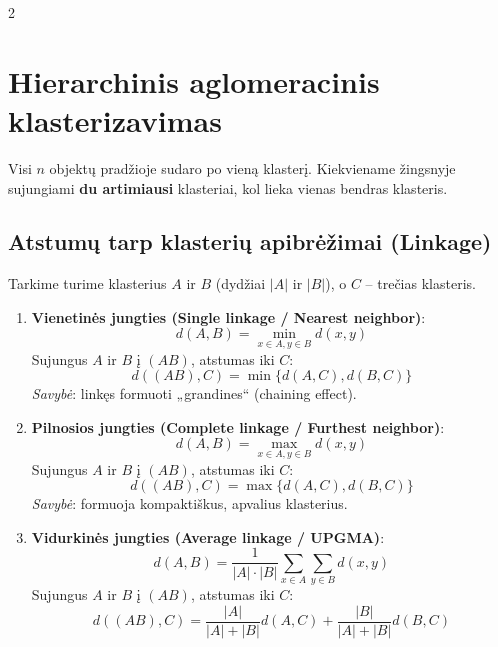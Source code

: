 \documentclass[9pt,a4paper]{article}
\begin{document}
\begin{multicols*}{2}
\section{Hierarchinis aglomeracinis klasterizavimas}
Visi $n$ objektų pradžioje sudaro po vieną klasterį. Kiekviename žingsnyje sujungiami \textbf{du artimiausi} klasteriai, kol lieka vienas bendras klasteris.

\subsection{Atstumų tarp klasterių apibrėžimai (Linkage)}
Tarkime turime klasterius $A$ ir $B$ (dydžiai $|A|$ ir $|B|$), o $C$ -- trečias klasteris.

\begin{enumerate}
    \item \textbf{Vienetinės jungties (Single linkage / Nearest neighbor)}:
    \begin{equation*}
        d(A, B) = \min_{x \in A, y \in B} d(x, y)
    \end{equation*}
    Sujungus $A$ ir $B$ į $(AB)$, atstumas iki $C$:
    \begin{equation*}
        d((AB), C) = \min\{d(A, C), d(B, C)\}
    \end{equation*}
    \textit{Savybė}: linkęs formuoti „grandines“ (chaining effect).

    \item \textbf{Pilnosios jungties (Complete linkage / Furthest neighbor)}:
    \begin{equation*}
        d(A, B) = \max_{x \in A, y \in B} d(x, y)
    \end{equation*}
    Sujungus $A$ ir $B$ į $(AB)$, atstumas iki $C$:
    \begin{equation*}
        d((AB), C) = \max\{d(A, C), d(B, C)\}
    \end{equation*}
    \textit{Savybė}: formuoja kompaktiškus, apvalius klasterius.

    \item \textbf{Vidurkinės jungties (Average linkage / UPGMA)}:
    \begin{equation*}
        d(A, B) = \frac{1}{|A|\cdot |B|} \sum_{x \in A}\sum_{y \in B} d(x, y)
    \end{equation*}
    Sujungus $A$ ir $B$ į $(AB)$, atstumas iki $C$:
    \begin{equation*}
        d((AB), C) = \frac{|A|}{|A|+|B|}d(A, C) + \frac{|B|}{|A|+|B|}d(B, C)
    \end{equation*}


\end{enumerate}
\end{multicols*}
\end{document}
